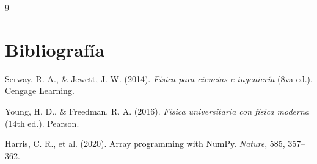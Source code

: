 
\begin{thebibliography}{9}
\chapter{Bibliografía}  %
\thispagestyle{fancy}


  Serway, R. A., \& Jewett, J. W. (2014).
  \emph{Física para ciencias e ingeniería} (8va ed.).
  Cengage Learning.

  Young, H. D., \& Freedman, R. A. (2016).
  \emph{Física universitaria con física moderna} (14th ed.).
  Pearson.

  Harris, C. R., et al. (2020).
  Array programming with NumPy.
  \emph{Nature}, 585, 357--362.


\end{thebibliography}